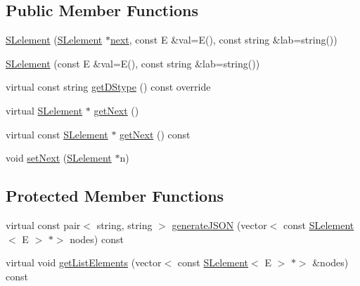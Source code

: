\subsection*{Public Member Functions}
\begin{DoxyCompactItemize}
\item 
\mbox{\hyperlink{classbridges_1_1datastructure_1_1_s_lelement_ac69e99f5b2b729a217160ee0517751aa}{S\+Lelement}} (\mbox{\hyperlink{classbridges_1_1datastructure_1_1_s_lelement}{S\+Lelement}} $\ast$\mbox{\hyperlink{classbridges_1_1datastructure_1_1_s_lelement_afc016a593a4a5aba82021ee34edadbfc}{next}}, const E \&val=E(), const string \&lab=string())
\item 
\mbox{\hyperlink{classbridges_1_1datastructure_1_1_s_lelement_a2f56e5f74a2cb43ab6ea718ae5bfdcbf}{S\+Lelement}} (const E \&val=E(), const string \&lab=string())
\item 
virtual const string \mbox{\hyperlink{classbridges_1_1datastructure_1_1_s_lelement_a602156aacacd73d1faa365d68d8af31b}{get\+D\+Stype}} () const override
\item 
virtual \mbox{\hyperlink{classbridges_1_1datastructure_1_1_s_lelement}{S\+Lelement}} $\ast$ \mbox{\hyperlink{classbridges_1_1datastructure_1_1_s_lelement_ae43dd771d9ced7cb17f1d35f34cd9a42}{get\+Next}} ()
\item 
virtual const \mbox{\hyperlink{classbridges_1_1datastructure_1_1_s_lelement}{S\+Lelement}} $\ast$ \mbox{\hyperlink{classbridges_1_1datastructure_1_1_s_lelement_a8c62cb82fa64bbfe9ebb7334a5fea417}{get\+Next}} () const
\item 
void \mbox{\hyperlink{classbridges_1_1datastructure_1_1_s_lelement_acf736223b4cd27b0771b262870d70b94}{set\+Next}} (\mbox{\hyperlink{classbridges_1_1datastructure_1_1_s_lelement}{S\+Lelement}} $\ast$n)
\end{DoxyCompactItemize}
\subsection*{Protected Member Functions}
\begin{DoxyCompactItemize}
\item 
virtual const pair$<$ string, string $>$ \mbox{\hyperlink{classbridges_1_1datastructure_1_1_s_lelement_a15d224314bbda510603042b504322410}{generate\+J\+S\+ON}} (vector$<$ const \mbox{\hyperlink{classbridges_1_1datastructure_1_1_s_lelement}{S\+Lelement}}$<$ E $>$ $\ast$$>$ nodes) const
\item 
virtual void \mbox{\hyperlink{classbridges_1_1datastructure_1_1_s_lelement_a81b68786cb93fe0f7edb48af789535a5}{get\+List\+Elements}} (vector$<$ const \mbox{\hyperlink{classbridges_1_1datastructure_1_1_s_lelement}{S\+Lelement}}$<$ E $>$ $\ast$$>$ \&nodes) const
\end{DoxyCompactItemize}
